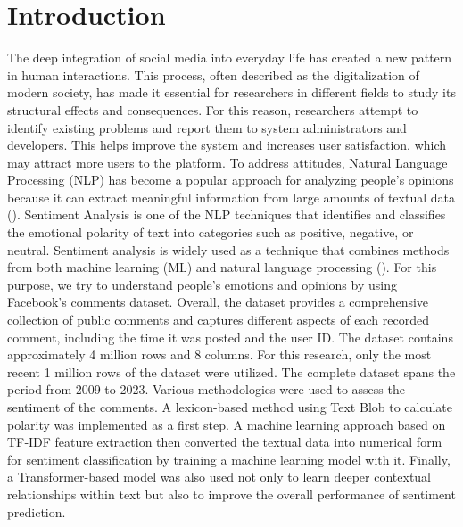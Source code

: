\documentclass[twoside]{article}
\begin{document}
\section{Introduction}
The deep integration of social media into everyday life has created a new pattern in human interactions. This process, often described as the digitalization of modern society, has made it essential for researchers in different fields to study its structural effects and consequences. For this reason, researchers attempt to identify existing problems and report them to system administrators and developers. This helps improve the system and increases user satisfaction, which may attract more users to the platform.
To address attitudes, Natural Language Processing (NLP) has become a popular approach for analyzing people’s opinions because it can extract meaningful information from large amounts of textual data (\cite{Go:2009}). 
Sentiment Analysis is one of the NLP techniques that identifies and classifies the emotional polarity of text into categories such as positive, negative, or neutral. Sentiment analysis is widely used as a technique that combines methods from both machine learning (ML) and natural language processing (\cite{Yadav:2023}). 
For this purpose, we try to understand people’s emotions and opinions by using Facebook’s comments dataset. Overall, the dataset provides a comprehensive collection of public comments and captures different aspects of each recorded comment, including the time it was posted and the user ID. The dataset contains approximately 4 million rows and 8 columns. For this research, only the most recent 1 million rows of the dataset were utilized. The complete dataset spans the period from 2009 to 2023.
Various methodologies were used to assess the sentiment of the comments. A lexicon-based method using Text Blob to calculate polarity was implemented as a first step. A machine learning approach based on TF‑IDF feature extraction then converted the textual data into numerical form for sentiment classification by training a machine learning model with it. Finally, a Transformer-based model was also used not only to learn deeper contextual relationships within text but also to improve the overall performance of sentiment prediction.
\end{document}
